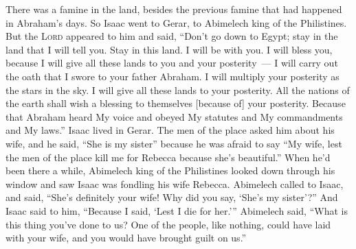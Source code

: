 
\begin{inparaenum}
   There was a famine in the land, besides the previous famine that had happened in Abraham's days. So Isaac went to Gerar, to Abimelech king of the Philistines.%
   But the \textsc{Lord} appeared to him and said, ``Don't go down to Egypt; stay in the land that I will tell you.%
   Stay in this land. I will be with you. I will bless you, because I will give all these lands to you and your posterity~--- I will carry out the oath that I swore to your father Abraham.%
   I will multiply your posterity as the stars in the sky. I will give all these lands to your posterity. All the nations of the earth shall wish a blessing to themselves [because of] your posterity.%
   Because that Abraham heard My voice and obeyed My statutes and My commandments and My laws.''%
   Isaac lived in Gerar.%
   The men of the place asked him about his wife, and he said, ``She is my sister'' because he was afraid to say ``My wife, lest the men of the place kill me for Rebecca because she's beautiful.''%
   When he'd been there a while, Abimelech king of the Philistines looked down through his window and saw Isaac was fondling his wife Rebecca.%
   Abimelech called to Isaac, and said, ``She's definitely your wife! Why did you say, `She's my sister'?'' And Isaac said to him, ``Because I said, `Lest I die for her.'\thinspace''%
   Abimelech said, ``What is this thing you've done to us? One of the people, like nothing, could have laid with your wife, and you would have brought guilt on us.''%

\end{inparaenum}
